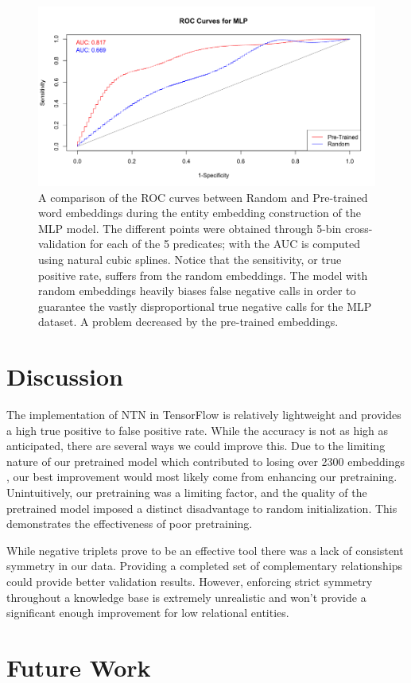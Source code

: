 \documentclass[11.5pt]{article}
\newcounter{graphics}
\begin{document}
\begin{figure}[h!]
 \includegraphics[width=1\textwidth]{report_mlp/CV-ROC.png}
  \caption{\small A comparison of the ROC curves between Random and Pre-trained word embeddings during the entity embedding construction of the MLP model. The different points were obtained through 5-bin cross-validation for each of the 5 predicates; with the AUC is computed using natural cubic splines. Notice that the sensitivity, or true positive rate, suffers from the random embeddings. The model with random embeddings heavily biases false negative calls in order to guarantee the vastly disproportional true negative calls for the MLP dataset. A problem decreased by the pre-trained embeddings.}
 \label{CV-ROC}
\end{figure}


\section{Discussion}

The implementation of NTN in TensorFlow is relatively lightweight and provides a high true positive to false positive rate. While the accuracy is not as high as anticipated, there are several ways we could improve this. Due to the limiting nature of our pretrained model which contributed to losing over 2300 embeddings , our best improvement would most likely come from enhancing our pretraining. Unintuitively, our pretraining was a limiting factor, and the quality of the pretrained model imposed a distinct disadvantage to random initialization. This demonstrates the effectiveness of poor pretraining. 

While negative triplets prove to be an effective tool there was a lack of consistent symmetry in our data. Providing a completed set of complementary relationships could provide better validation results. However, enforcing strict symmetry throughout a knowledge base is extremely unrealistic and won't provide a significant enough improvement for low relational entities.



\section{Future Work}




{}
\end{document}
